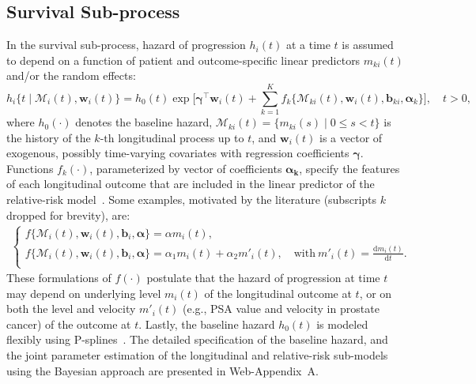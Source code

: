\subsection{Survival Sub-process}
\label{subsec:surival_sub_model}
In the survival sub-process, hazard of progression $h_i(t)$ at a time $t$ is assumed to depend on a function of patient and outcome-specific linear predictors $m_{ki}(t)$ and/or the random effects:
\begin{equation*}
\label{eq:rel_risk_model}
h_i\big\{t \mid \mathcal{M}_i(t), \boldsymbol{w}_i(t)\big\} = h_0(t) \exp\Big[\boldsymbol{\gamma}^{\top}\boldsymbol{w}_i(t) + \sum_{k=1}^{K} f_{k} \big\{ \mathcal{M}_{ki}(t), \boldsymbol{w}_i(t), \boldsymbol{b}_{ki}, \boldsymbol{\alpha}_{k} \big\}\Big], \quad t>0,
\end{equation*}
where $h_0(\cdot)$ denotes the baseline hazard, $\mathcal{M}_{ki}(t)=\{m_{ki}(s) \mid 0 \leq s < t \}$ is the history of the ${k\mbox{-th}}$ longitudinal process up to $t$, and $\boldsymbol{w}_i(t)$ is a vector of exogenous, possibly time-varying covariates with regression coefficients $\boldsymbol{\gamma}$. Functions $f_{k}(\cdot)$, parameterized by vector of coefficients $\boldsymbol{\alpha_{k}}$, specify the features of each longitudinal outcome that are included in the linear predictor of the relative-risk model~\citep{brown2009assessing,rizopoulos2012joint,taylor2013real}. Some examples, motivated by the literature (subscripts $k$ dropped for brevity), are:
\begin{eqnarray*}
\left \{
\begin{array}{l}
f\big\{\mathcal{M}_{i}(t), \boldsymbol{w}_i(t), \boldsymbol{b}_{i}, \boldsymbol{\alpha} \big\} = \alpha m_{i}(t),\\
f\big\{ \mathcal{M}_{i}(t), \boldsymbol{w}_i(t), \boldsymbol{b}_{i}, \boldsymbol{\alpha}\big\} = \alpha_1 m_{i}(t) + \alpha_2 m'_{i}(t),\quad \text{with}\  m'_{i}(t) = \frac{\mathrm{d}{m_{i}(t)}}{\mathrm{d}{t}}.\\
\end{array}
\right.
\end{eqnarray*}
These formulations of $f(\cdot)$ postulate that the hazard of progression at time $t$ may depend on underlying level $m_i(t)$ of the longitudinal outcome at $t$, or on both the level and velocity $m'_i(t)$ (e.g., PSA value and velocity in prostate cancer) of the outcome at $t$. Lastly, the baseline hazard $h_0(t)$ is modeled flexibly using P-splines~\citep{eilers1996flexible}. The detailed specification of the baseline hazard, and the joint parameter estimation of the longitudinal and relative-risk sub-models using the Bayesian approach are presented in Web-Appendix~A.
